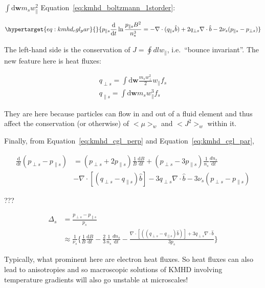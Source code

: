 \documentclass[
  notoc %
]{tufte-book}
\begin{document}
\(\int \mathrm{d}\mathbf{w}m_sw_\parallel^2\)
Equation~\ref{eq:kmhd_boltzmann_1storder}:

\begin{equation}\protect\hypertarget{eq:kmhd_cgl_par}{}{
p_{\parallel s}\frac{\mathrm{d}}{\mathrm{d}t}\ln\frac{p_{\parallel s}B^2}{n_s^3} = -\nabla\cdot(q_{\parallel s}\hat{b}) + 2q_{\perp s}\nabla\cdot\hat{b} - 2\nu_s (p_{\parallel s} - p_{\perp s})
}\label{eq:kmhd_cgl_par}\end{equation}

The left-hand side is the conservation of \(J=\oint dl w_\parallel\),
i.e.~``bounce invariant''. The new feature here is heat fluxes:

\[
\begin{aligned}
q_{\perp s} = \int \mathrm{d}\mathbf{w}\frac{m_sw_\perp^2}{2}w_\parallel f_s \\
q_{\parallel s} = \int \mathrm{d}\mathbf{w}m_sw_\parallel^3 f_s
\end{aligned}
\]

They are here because particles can flow in and out of a fluid element
and thus affect the conservation (or otherwise) of \(<\mu>_w\) and
\(<J^2>_w\) within it.

Finally, from Equation~\ref{eq:kmhd_cgl_perp} and
Equation~\ref{eq:kmhd_cgl_par},

\[
\begin{aligned}
\frac{\mathrm{d}}{\mathrm{d}t}(p_{\perp s} - p_{\parallel s}) &= (p_{\perp s} + 2p_{\parallel s})\frac{1}{B}\frac{\mathrm{d}B}{\mathrm{d}t} + (p_{\perp s} - 3p_{\parallel s})\frac{1}{n_s}\frac{dn_s}{\mathrm{d}t} \\
&-\nabla\cdot[(q_{\perp s}-q_{\parallel s})\hat{b}] - 3q_{\perp s}\nabla\cdot\hat{b} - 3\nu_s(p_{\perp s} - p_{\parallel s})
\end{aligned}
\]

???

\[
\begin{aligned}
\Delta_s &= \frac{p_{\perp s}-p_{\parallel s}}{p_s} \\
&\approx \frac{1}{\nu_s}\Big\{ \frac{1}{B}\frac{\mathrm{d}B}{\mathrm{d}t} - \frac{2}{3}\frac{1}{n_s}\frac{dn_s}{\mathrm{d}t} - \frac{\nabla\cdot[((q_{\perp s} - q_{\parallel s})\hat{b})] + 3q_{\perp s}\nabla\cdot\hat{b}}{3p_s} \Big\}
\end{aligned}
\]

Typically, what prominent here are electron heat fluxes. So heat fluxes
can also lead to anisotropies and so macroscopic solutions of KMHD
involving temperature gradients will also go unstable at microscales!
\end{document}
